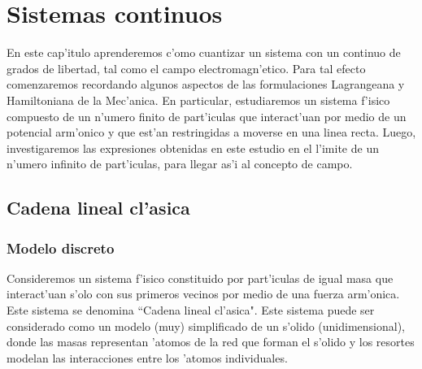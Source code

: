 \chapter{Sistemas continuos}

En este cap'itulo aprenderemos c'omo cuantizar un sistema con un continuo de
grados de libertad, tal como el campo electromagn'etico. Para tal efecto
comenzaremos recordando algunos aspectos de las formulaciones Lagrangeana y
Hamiltoniana de la Mec'anica. En particular, estudiaremos un sistema f'isico
compuesto de un n'umero finito de part'iculas que interact'uan por medio de un
potencial arm'onico y que est'an restringidas a moverse en una linea recta.
Luego,
investigaremos las expresiones obtenidas en este estudio en el l'imite de un
n'umero infinito de part'iculas, para llegar as'i al concepto de campo.

\section{Cadena lineal cl'asica}

\subsection{Modelo discreto}

Consideremos un sistema f'isico constituido por part'iculas de igual masa que 
interact'uan s'olo con sus primeros vecinos por medio de una fuerza arm'onica.
Este sistema se denomina ``Cadena lineal cl'asica". Este sistema puede ser
considerado como un modelo (muy) simplificado de un s'olido (unidimensional),
donde las masas representan 'atomos de la red que forman el s'olido y los
resortes modelan las interacciones entre los 'atomos individuales.

